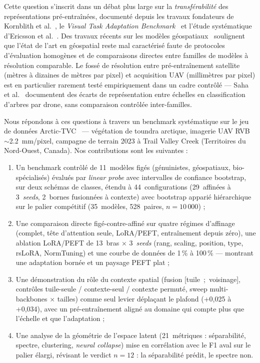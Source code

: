 \documentclass[11pt,a4paper]{article}
\newcommand{\lp}{\emph{linear probe}}
\begin{document}
Cette question s'inscrit dans un débat plus large sur la \emph{transférabilité} des représentations pré-entraînées, documenté depuis les travaux fondateurs de Kornblith et al.~\autocite{kornblith2019transferability}, le \emph{Visual Task Adaptation Benchmark}~\autocite{zhai2019large} et l'étude systématique d'Ericsson et al.~\autocite{ericsson2021evaluating}. Des travaux récents sur les modèles géospatiaux~\autocite{corley2026nobodyknows,lacoste2024geobench,shang2026benchmarking} soulignent que l'état de l'art en géospatial reste mal caractérisé faute de protocoles d'évaluation homogènes et de comparaisons directes entre familles de modèles à résolution comparable. Le fossé de résolution entre pré-entraînement satellite (mètres à dizaines de mètres par pixel) et acquisition UAV (millimètres par pixel) est en particulier rarement testé empiriquement dans un cadre contrôlé — Saha et al.~\autocite{saha2026understanding} documentent des écarts de représentation entre échelles en classification d'arbres par drone, sans comparaison contrôlée inter-familles.

Nous répondons à ces questions à travers un benchmark systématique sur le jeu de données Arctic-TVC~\autocite{tvc2025} — végétation de toundra arctique, imagerie UAV RVB $\sim$2.2~mm/pixel, campagne de terrain 2023 à Trail Valley Creek (Territoires du Nord-Ouest, Canada). Nos contributions sont les suivantes :

\begin{enumerate}
	\item Un benchmark contrôlé de 11~modèles figés (génuinistes, géospatiaux, bio-spécialisés) évalués par \lp{} avec intervalles de confiance bootstrap, sur deux schémas de classes, étendu à 44~configurations (29~affinées à 3~\emph{seeds}, 2~bornes fusionnées à contexte) avec bootstrap apparié hiérarchique sur le palier compétitif (35~modèles, 528~paires, $n=10\,000$) ;
	\item Une comparaison directe figé-contre-affiné sur quatre régimes d'affinage (complet, tête d'attention seule, LoRA/PEFT, entraînement depuis zéro), une ablation LoRA/PEFT de 13~bras $\times$ 3~\emph{seeds} (rang, scaling, position, type, rsLoRA, NormTuning) et une courbe de données de 1\,\% à 100\,\% — montrant une adaptation bornée et un paysage PEFT plat ;
	\item Une démonstration du rôle du contexte spatial (fusion [tuile~;~voisinage], contrôles tuile-seule / contexte-seul / contexte permuté, sweep multi-backbones $\times$ tailles) comme seul levier déplaçant le plafond (+0,025 à +0,034), avec un pré-entraînement aligné au domaine qui compte plus que l'échelle et que l'adaptation ;
	\item Une analyse de la géométrie de l'espace latent (21~métriques : séparabilité, spectre, clustering, \emph{neural collapse}) mise en corrélation avec le F1 aval sur le palier élargi, révisant le verdict $n=12$ : la séparabilité prédit, le spectre non.
\end{enumerate}
\end{document}
